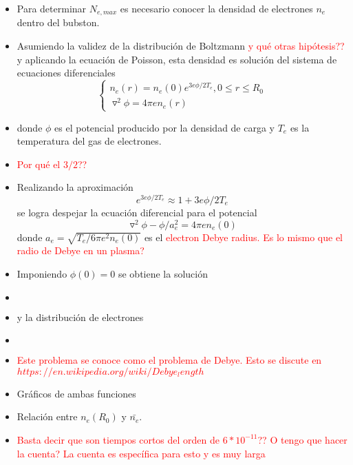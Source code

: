 \documentclass[aps,prb,twocolumn,superscriptaddress,floatfix,longbibliography,10pt]{revtex4-2}
\newif\ifptitle
\newif\ifpnumber
\newcounter{para}
\newcommand\ptitle[1]{\par\refstepcounter{para}
{\ifpnumber{\noindent\textcolor{lightgray}{\textbf{\thepara}}\indent}\fi}
{\ifptitle{\textbf{[{#1}]}}\fi}}
\begin{document}
\begin{itemize}
  \item Para determinar $N_{e, max}$ es necesario conocer la densidad de electrones $n_e$ dentro del bubston.
  \item Asumiendo la validez de la distribución de Boltzmann \textcolor{red}{y qué otras hipótesis??} y aplicando la ecuación de Poisson, esta densidad es solución del sistema de ecuaciones diferenciales
  \[
  \left\{\begin{matrix}
    n_e(r) = n_e(0)e^{3 e \phi / 2 T_e}, 0 \leq r \leq R_0 \\
    \triangledown^2 \phi = 4 \pi e n_e(r)
  \end{matrix}\right.
  \]
  \item donde $\phi$ es el potencial producido por la densidad de carga y $T_e$ es la temperatura del gas de electrones.
  \item \textcolor{red}{Por qué el $3/2$??}
  \item Realizando la aproximación
  \[e^{3 e \phi / 2 T_e} \approx 1 + 3e \phi/2T_e \]
  se logra despejar la ecuación diferencial para el potencial
  \[\triangledown^2 \phi - \phi/a_e^2 = 4 \pi e n_e(0) \]
  donde
  $a_e = \sqrt{T_e/6\pi e^2 n_e(0)}$
  es el \textcolor{red}{electron Debye radius. Es lo mismo que el radio de Debye en un plasma?}

  \item Imponiendo $\phi(0) = 0$ se obtiene la solución
  \item \[ \]
  \item y la distribución de electrones
  \item \[ \]
  \item \textcolor{red}{Este problema se conoce como el problema de Debye. Esto se discute en $https://en.wikipedia.org/wiki/Debye_length$}


  \item Gráficos de ambas funciones
  \item Relación entre $n_e(R_0)$ y $\bar{n_e}$.
\end{itemize}


\ptitle{Cálculo del tiempo al que se alcanza la densidad media máxima $t_0$}
\begin{itemize}
  \item \textcolor{red}{Basta decir que son tiempos cortos del orden de $6*10^{-11}$?? O tengo que hacer la cuenta? La cuenta es específica para esto y es muy larga}
\end{itemize}
\end{document}
